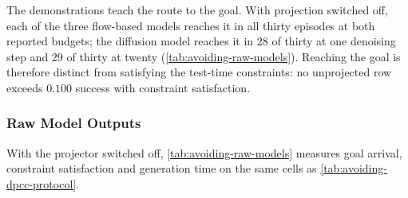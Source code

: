 The demonstrations teach the route to the goal. With projection switched off, each of the three
flow-based models reaches it in all thirty episodes at both reported budgets; the diffusion model
reaches it in 28 of thirty at one denoising step and 29 of thirty at twenty
(\autoref{tab:avoiding-raw-models}). Reaching the goal is therefore distinct from satisfying the
test-time constraints: no unprojected row exceeds $0.100$ success with constraint satisfaction.

\subsubsection{Raw Model Outputs}\label{sec:res:avoiding:raw}

With the projector switched off, \autoref{tab:avoiding-raw-models} measures goal arrival, constraint satisfaction and generation time on the same cells as \autoref{tab:avoiding-dpcc-protocol}.

